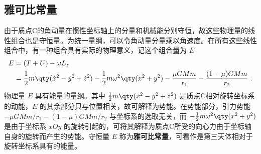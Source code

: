 \subsection{雅可比常量}
由于质点C的角动量在惯性坐标轴上的分量和机械能分别守恒，故这些物理量的线性组合也是守恒量。为统一量纲，可以令角动量分量乘以角速度。在所有这些线性组合中，有一种组合具有实际的物理意义，记这个组合量为 $E$ 
\begin{equation}%
\begin{aligned}
E &=(T+U)-\omega L_z\\
&=\frac{1}{2}m\qty(\dot{x}^2-\dot{y}^2+\dot{z}^2)-\frac{1}{2}m\omega^2\qty(x^2+y^2)-\frac{\mu GMm}{r_1}-\frac{(1-\mu)GMm}{r_2}~.
\end{aligned}
\end{equation}
物理量 $E$ 具有能量的量纲。其中 $\frac{1}{2}m\qty(\dot{x}^2-\dot{y}^2+\dot{z}^2)$ 是质点C相对旋转坐标系的动能，$E$ 的其余部分只与位置相关，故可解释为势能。在势能部分，引力势能 $-\mu GMm/r_1-(1-\mu)GMm/r_2$ 与坐标系的选取无关，而 $-\frac{1}{2}m\omega^2\qty(x^2+y^2)$ 是由于坐标系 $xOy$ 的旋转引起的，可将其解释为质点C所受的向心力由于坐标轴自身的旋转而产生的势能。守恒量 $E$ 称为\textbf{雅可比常量}，可看作是第三天体相对于旋转坐标系具有的能量。

